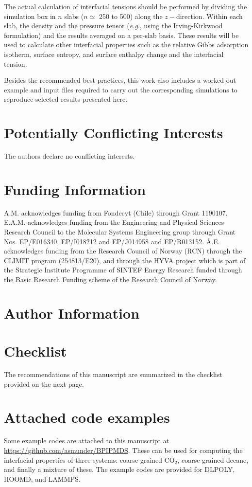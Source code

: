 \documentclass[9pt,bestpractices]{livecoms}
\newcommand{\githubrepository}{\url{https://github.com/asmunder/BPIPMDS}}  %
\begin{document}
The actual calculation of interfacial tensions should be performed by dividing
the simulation box in $n$ slabs ($n{\simeq}$ 250 to 500) along
the $z-$direction. Within each slab, the density and the pressure tensor
(\textit{e.g}., using the Irving-Kirkwood formulation) and the results averaged
on a per-slab basis. These results will be used to calculate other interfacial
properties such as the relative Gibbs adsorption isotherm, surface entropy, and
surface enthalpy change and the interfacial tension.

Besides the recommended best practices, this work also includes a worked-out
example and input files required to carry out the corresponding simulations to
reproduce selected results presented here.

\section{Potentially Conflicting Interests}
The authors declare no conflicting interests.

\section{Funding Information}
A.M. acknowledges funding from Fondecyt (Chile) through Grant 1190107. E.A.M.
acknowledges funding from the Engineering and Physical Sciences Research
Council to the Molecular Systems Engineering group through Grant Nos.
EP/E016340, EP/I018212 and EP/J014958 and EP/R013152.
\AA{}.E. acknowledges funding from the Research Council of Norway (RCN) 
through the CLIMIT program (254813/E20), and through the HYVA project which 
is part of the Strategic Institute Programme of SINTEF Energy Research funded 
through the Basic Research Funding scheme of the Research Council of Norway.

\section*{Author Information}
\makeorcid
\section{Checklist}
\label{checklist}
The recommendations of this manuscript are summarized in the checklist provided on the next page.

\section{Attached code examples}
Some example codes are attached to this manuscript at \githubrepository.
These can be used for computing the interfacial properties of three systems: coarse-grained CO$_2$, coarse-grained decane, and finally a mixture of these.
The example codes are provided for DLPOLY, HOOMD, and LAMMPS.
\end{document}
